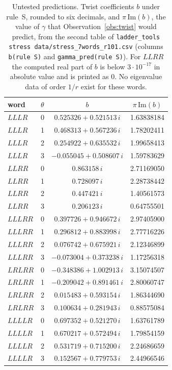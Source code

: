 \documentclass[11pt]{amsart}
\theoremstyle{definition}
\theoremstyle{remark}
\begin{document}
\begin{table}[ht]
\centering
\begin{tabular}{llcc}
\toprule
word & $\theta$ & $b$ & $\pi\,\mathrm{Im}(b)$ \\
\midrule
$LLLR$  & 0 & $0.525326 + 0.521513\,i$ & 1.63838184 \\
$LLLR$  & 1 & $0.468313 + 0.567236\,i$ & 1.78202411 \\
$LLLR$  & 2 & $0.254922 + 0.635532\,i$ & 1.99658413 \\
$LLLR$  & 3 & $-0.055045 + 0.508607\,i$ & 1.59783629 \\
$LLRR$  & 0 & $0.863158\,i$ & 2.71169050 \\
$LLRR$  & 1 & $0.728097\,i$ & 2.28738442 \\
$LLRR$  & 2 & $0.447421\,i$ & 1.40561573 \\
$LLRR$  & 3 & $0.206123\,i$ & 0.64755501 \\
$LLLRR$ & 0 & $0.397726 + 0.946672\,i$ & 2.97405900 \\
$LLLRR$ & 1 & $0.296812 + 0.883998\,i$ & 2.77716226 \\
$LLLRR$ & 2 & $0.076742 + 0.675921\,i$ & 2.12346899 \\
$LLLRR$ & 3 & $-0.073004 + 0.373238\,i$ & 1.17256318 \\
$LRLRR$ & 0 & $-0.348386 + 1.002913\,i$ & 3.15074507 \\
$LRLRR$ & 1 & $-0.209042 + 0.891461\,i$ & 2.80060747 \\
$LRLRR$ & 2 & $0.015483 + 0.593154\,i$ & 1.86344690 \\
$LRLRR$ & 3 & $0.100634 + 0.281943\,i$ & 0.88575084 \\
$LLLLR$ & 0 & $0.697352 + 0.521270\,i$ & 1.63761789 \\
$LLLLR$ & 1 & $0.670217 + 0.572494\,i$ & 1.79854159 \\
$LLLLR$ & 2 & $0.531719 + 0.715200\,i$ & 2.24686659 \\
$LLLLR$ & 3 & $0.152567 + 0.779753\,i$ & 2.44966546 \\
\bottomrule
\end{tabular}
\caption{Untested predictions. Twist coefficients $b$ under rule~S, rounded to six
decimals, and $\pi\,\mathrm{Im}(b)$, the value of $\gamma$ that
Observation~\ref{obs:twist} would predict, from the second table of
\texttt{ladder\_tools stress data/stress\_7words\_r101.csv} (columns
\texttt{b(rule S)} and \texttt{gamma\_pred(rule S)}). For $LLRR$ the computed real part
of $b$ is below $3\cdot10^{-17}$ in absolute value and is printed as $0$. No
eigenvalue data of order $1/r$ exist for these words.}
\label{tab:predict}
\end{table}
\end{document}
